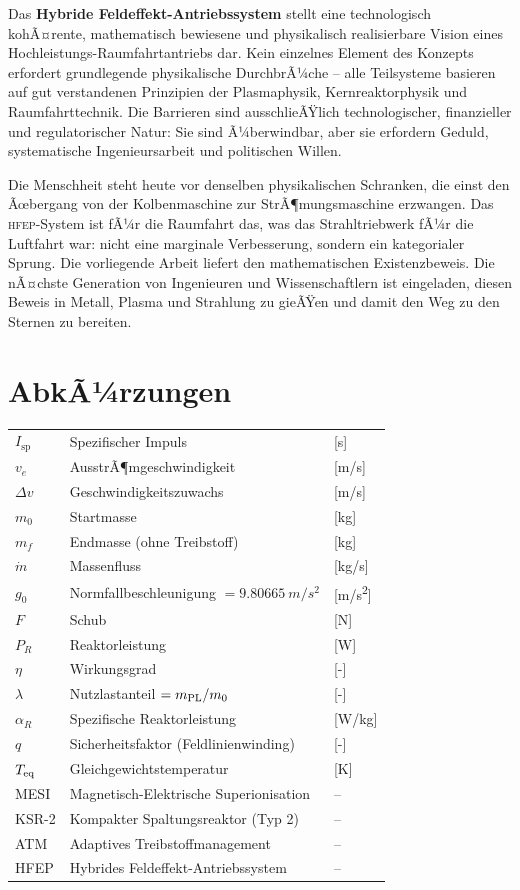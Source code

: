﻿\documentclass[a4paper,12pt,twoside]{article}
\theoremstyle{plain}
\theoremstyle{definition}
\theoremstyle{remark}
\newcommand{\Isp}{I_{\mathrm{sp}}}
\newcommand{\ve}{v_e}
\newcommand{\Dv}{\Delta v}
\newcommand{\mdot}{\dot{m}}
\newcommand{\mzero}{m_0}
\newcommand{\mf}{m_f}
\newcommand{\HFEP}{\textsc{hfep}}
\newcommand{\gzero}{g_0}
\begin{document}
	Das \textbf{Hybride Feldeffekt-Antriebssystem} stellt eine technologisch
	kohÃ¤rente, mathematisch bewiesene und physikalisch realisierbare Vision eines
	Hochleistungs-Raumfahrtantriebs dar. Kein einzelnes Element des Konzepts
	erfordert grundlegende physikalische DurchbrÃ¼che -- alle Teilsysteme basieren
	auf gut verstandenen Prinzipien der Plasma\-physik, Kernreaktorphysik und
	Raumfahrttechnik. Die Barrieren sind ausschlieÃŸlich technologischer,
	finanzieller und regulatorischer Natur: Sie sind Ã¼berwindbar, aber sie
	erfordern Geduld, systematische Ingenieursarbeit und politischen Willen.

	Die Menschheit steht heute vor denselben physikalischen Schranken, die
	einst den Ãœbergang von der Kolbenmaschine zur StrÃ¶mungsmaschine erzwangen.
	Das \HFEP-System ist fÃ¼r die Raumfahrt das, was das Strahltriebwerk fÃ¼r
	die Luftfahrt war: nicht eine marginale Verbesserung, sondern ein
	kategorialer Sprung. Die vorliegende Arbeit liefert den mathematischen
	Existenzbeweis. Die nÃ¤chste Generation von Ingenieuren und Wissenschaftlern
	ist eingeladen, diesen Beweis in Metall, Plasma und Strahlung zu gieÃŸen
	und damit den Weg zu den Sternen zu bereiten.

	\section*{AbkÃ¼rzungen}
	
	\begin{tabular}{lll}
		$\Isp$ & Spezifischer Impuls & [s]\\
		$\ve$ & AusstrÃ¶mgeschwindigkeit & [m/s]\\
		$\Dv$ & Geschwindigkeitszuwachs & [m/s]\\
		$\mzero$ & Startmasse & [kg]\\
		$\mf$ & Endmasse (ohne Treibstoff) & [kg]\\
		$\mdot$ & Massenfluss & [kg/s]\\
		$\gzero$ & Normfallbeschleunigung $= \SI{9.80665}{m/s^2}$ & [m/s\textsuperscript{2}]\\
		$F$ & Schub & [N]\\
		$P_R$ & Reaktorleistung & [W]\\
		$\eta$ & Wirkungsgrad & [-]\\
		$\lambda$ & Nutzlastanteil $= m_{\rm PL}/\mzero$ & [-]\\
		$\alpha_R$ & Spezifische Reaktorleistung & [W/kg]\\
		$q$ & Sicherheitsfaktor (Feldlinienwinding) & [-]\\
		$T_{\rm eq}$ & Gleichgewichtstemperatur & [K]\\
		MESI & Magnetisch-Elektrische Superionisation & --\\
		KSR-2 & Kompakter Spaltungsreaktor (Typ 2) & --\\
		ATM & Adaptives Treibstoffmanagement & --\\
		HFEP & Hybrides Feldeffekt-Antriebssystem & --\\
	\end{tabular}
\end{document}
